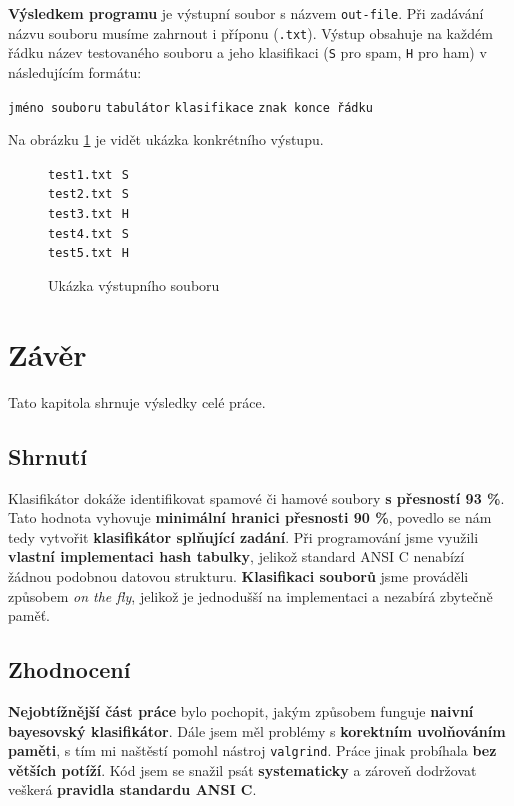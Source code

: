 \documentclass[12pt]{report}
\newcommand\la{\textlangle}  					%
\newcommand\ra{\textrangle}						%
\newcommand\laratexttt[1]{\la\texttt{#1}\ra}	%
\newcommand\indentt[1]{						
	\setlength\parindent{5mm}
	#1
	\setlength\parindent{0mm}
	}											%
\begin{document}
	\textbf{Výsledkem programu} je výstupní soubor s názvem \laratexttt{out-file}. Při zadávání názvu souboru musíme zahrnout i příponu (\texttt{.txt}). Výstup obsahuje na každém řádku název testovaného souboru a jeho klasifikaci (\texttt{S} pro spam, \texttt{H} pro ham) v následujícím formátu:
	
	\indentt{\laratexttt{jméno souboru} \laratexttt{tabulátor} \laratexttt{klasifikace} \laratexttt{znak konce řádku}}

	Na obrázku \ref{fig:vystup} je vidět ukázka konkrétního výstupu.
	
	\begin{figure}
		\centering
		\begin{minipage}{40mm}
			\texttt{test1.txt}\,\tab\, \texttt{S}\, \return\\
			\texttt{test2.txt}\,\tab\, \texttt{S}\, \return\\
			\texttt{test3.txt}\,\tab\, \texttt{H}\, \return\\
			\texttt{test4.txt}\,\tab\, \texttt{S}\, \return\\
			\texttt{test5.txt}\,\tab\, \texttt{H}\, \return
		\end{minipage}
		\caption{Ukázka výstupního souboru}
		\label{fig:vystup}
	\end{figure}
	
	\chapter{Závěr}
	Tato kapitola shrnuje výsledky celé práce.
	
	\section{Shrnutí}
	Klasifikátor dokáže identifikovat spamové či hamové soubory \textbf{s přesností 93 \%}. Tato hodnota vyhovuje \textbf{minimální hranici přesnosti 90 \%}, povedlo se nám tedy vytvořit \textbf{klasifikátor splňující zadání}. Při programování jsme využili \textbf{vlastní implementaci hash tabulky}, jelikož standard ANSI C nenabízí žádnou podobnou datovou strukturu. \textbf{Klasifikaci souborů} jsme prováděli způsobem \textit{on the fly}, jelikož je jednodušší na implementaci a nezabírá zbytečně paměť.
	
	\section{Zhodnocení}
	\textbf{Nejobtížnější část práce} bylo pochopit, jakým způsobem funguje \textbf{naivní bayesovský klasifikátor}. Dále jsem měl problémy s \textbf{korektním uvolňováním paměti}, s tím mi naštěstí pomohl nástroj \texttt{valgrind}. Práce jinak probíhala \textbf{bez větších potíží}. Kód jsem se snažil psát \textbf{systematicky} a zároveň dodržovat veškerá \textbf{pravidla standardu ANSI C}.
	
\end{document}
